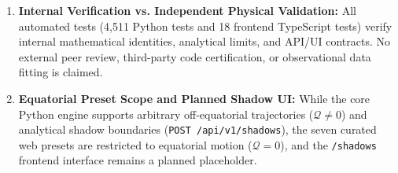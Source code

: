 \begin{enumerate}
    The 10,001-node residual audit provides high-confidence sampled numerical evidence of $\mathcal{O}(s^2)$ scaling. However, it does not constitute a certified analytical upper bound on the continuous supremum $\sup_\phi \|\mathbf{r}_{\rm num} - \mathbf{r}_{\rm asym}\|$ over the continuum. Similarly, the seven-preset Hamiltonian drift values in Table~\ref{tab:preset_drift_ledger} are run-specific diagnostics rather than universal error bounds.
    \item \textbf{Internal Verification vs. Independent Physical Validation:}  
    All automated tests (4,511 Python tests and 18 frontend TypeScript tests) verify internal mathematical identities, analytical limits, and API/UI contracts. No external peer review, third-party code certification, or observational data fitting is claimed.
    \item \textbf{Equatorial Preset Scope and Planned Shadow UI:}  
    While the core Python engine supports arbitrary off-equatorial trajectories ($\mathcal{Q} \neq 0$) and analytical shadow boundaries (\texttt{POST /api/v1/shadows}), the seven curated web presets are restricted to equatorial motion ($\mathcal{Q} = 0$), and the \texttt{/shadows} frontend interface remains a planned placeholder.
\end{enumerate}

